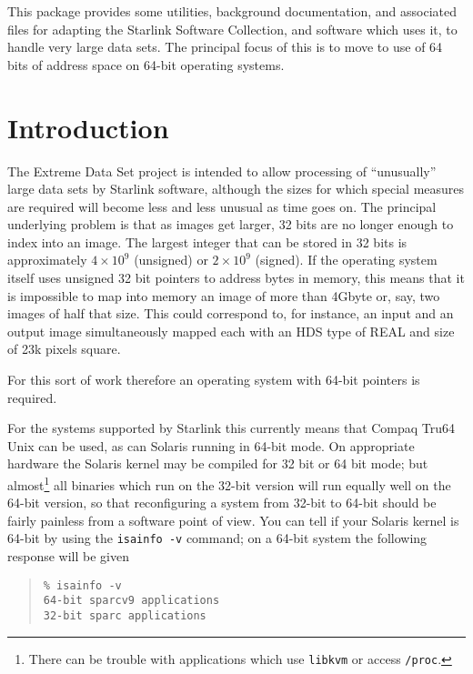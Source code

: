 \documentclass[twoside,11pt]{article}
\newcommand{\stardocinitials}  {SSN}
\newcommand{\stardocnumber}    {73.1 (draft)}
\newcommand{\stardocabstract}  {
This package provides some utilities, background documentation,
and associated files
for adapting the Starlink Software Collection, and software which uses it, 
to handle very large data sets.
The principal focus of this is to move to use of 64 bits of address
space on 64-bit operating systems.
}
\newcommand{\stardocname}{\stardocinitials /\stardocnumber}
\newenvironment{latexonly}{}{}
\renewcommand{\_}{\texttt{\symbol{95}}}
\newcommand{\file}[1]{{\tt #1}}
\newenvironment{squote}{\begin{quote}\begin{small}}{\end{small}\end{quote}}
\renewcommand{\thepage}{\roman{page}}
\begin{document}
\stardocabstract
  \newpage
  \begin{latexonly}
    \setlength{\parskip}{0mm}
    \tableofcontents
    \setlength{\parskip}{\medskipamount}
    \markboth{\stardocname}{\stardocname}
  \end{latexonly}
\cleardoublepage
\renewcommand{\thepage}{\arabic{page}}
\setcounter{page}{1}




\section{Introduction}

The Extreme Data Set project is intended to allow processing of ``unusually''
large data sets by Starlink software, 
although the sizes for which special measures
are required will become less and less unusual as time goes on.
The principal underlying problem is that as images get larger,
32 bits are no longer enough to index into an image.
The largest integer that can be stored in 32 bits 
is approximately $4 \times 10^9$ (unsigned) or $2 \times 10^9$ (signed).
If the operating system itself uses unsigned 32 bit pointers to 
address bytes
in memory, this means that it is impossible to map into memory 
an image of more
than 4Gbyte or, say, two images of half that size. 
This could correspond to, for instance, an input and an output image
simultaneously mapped each with an HDS type of \_REAL and 
size of 23k pixels square.

For this sort of work therefore an operating system with 64-bit 
pointers is required.

For the systems supported by
Starlink this currently means that Compaq Tru64 Unix can be used,
as can Solaris running in 64-bit mode.  
On appropriate hardware the Solaris kernel 
may be compiled for 32 bit or 64 bit mode;
but almost\footnote{
   There can be trouble with applications which use 
   \file{libkvm} or access \file{/proc}.}
all binaries which run on the 32-bit version
will run equally well on the 64-bit version, 
so that reconfiguring a system from 32-bit to 64-bit should be
fairly painless from a software point of view.
You can tell if your Solaris kernel is 64-bit 
by using the \file{isainfo -v} command; on a 64-bit system the
following response will be given
\begin{squote}
\begin{verbatim}
% isainfo -v
64-bit sparcv9 applications
32-bit sparc applications
\end{verbatim}
\end{squote}
\end{document}

